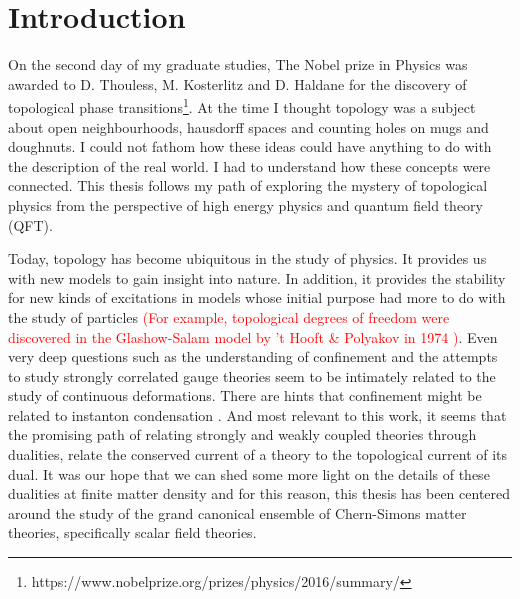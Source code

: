 
    \graphicspath{{Introduction_Folder/figures/PNG/}{Introduction_Folder/figures/PDF/}{Introduction_Folder/figures/}}

\chapter*{Introduction}


On the second day of my graduate studies, The Nobel prize in Physics was awarded to D. Thouless, M. Kosterlitz and D. Haldane for the discovery of topological phase transitions\footnote{https://www.nobelprize.org/prizes/physics/2016/summary/}. At the time I thought topology was a subject about open neighbourhoods, hausdorff spaces and counting holes on mugs and doughnuts. I could not fathom how these ideas could have anything to do with the description of the real world. I had to understand how these concepts were connected. This thesis follows my path of exploring the mystery of topological physics from the perspective of high energy physics and quantum field theory (QFT).

Today, topology has become ubiquitous in the study of physics. It provides us with new models to gain insight into nature. In addition, it provides the stability for new kinds of excitations in models whose initial purpose had more to do with the study of particles \textcolor{red}{(For example, topological degrees of freedom were discovered in the Glashow-Salam model by 't Hooft \& Polyakov in 1974 \cite{Polyakov:1974ek, tHooft:1974kcl})}. Even very deep questions such as the understanding of confinement and the attempts to study strongly correlated gauge theories seem to be intimately related to the study of continuous deformations. There are hints that confinement might be related to instanton condensation \cite{Polyakov:1976fu}. And most relevant to this work, it seems that the promising path of relating strongly and weakly coupled theories through dualities, relate the conserved current of a theory to the topological current of its dual. It was our hope that we can shed some more light on the details of these dualities at finite matter density and for this reason, this thesis has been centered around the study of the grand canonical ensemble of Chern-Simons matter theories, specifically scalar field theories.

